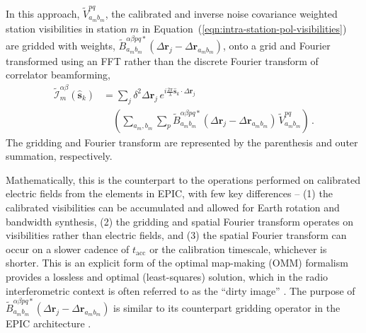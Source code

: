 \documentclass[
  journal=pasa,
  manuscript=article-type,
  year=2020,
  volume=37,
]{cup-journal}
\begin{document}
In this approach, $\widetilde{V}_{a_m b_m}^{pq}$, the calibrated and inverse noise covariance weighted station visibilities in station $m$ in Equation~(\ref{eqn:intra-station-pol-visibilities}) are gridded with weights, $\widetilde{B}_{a_m b_m}^{\alpha\beta pq*}(\Delta\boldsymbol{r}_j-\Delta\boldsymbol{r}_{a_m b_m})$, onto a grid and Fourier transformed using an FFT rather than the discrete Fourier transform of correlator beamforming,
\begin{align}
  \widetilde{\mathcal{I}}_m^{\alpha\beta}(\hat{\boldsymbol{s}}_k) &= \sum_j \delta^2 \Delta\boldsymbol{r}_j \, e^{i\frac{2\pi}{\lambda} \hat{\boldsymbol{s}}_k\cdot\Delta\boldsymbol{r}_j} \nonumber\\
  &\quad \left(\sum_{a_m,b_m} \sum_p \widetilde{B}_{a_m b_m}^{\alpha\beta pq*}(\Delta\boldsymbol{r}_j-\Delta\boldsymbol{r}_{a_m b_m}) \, \widetilde{V}_{a_m b_m}^{pq} \right) \, . \label{eqn:intra-station-pol-img-xfft-expl}
\end{align}
The gridding and Fourier transform are represented by the parenthesis and outer summation, respectively. 

Mathematically, this is the counterpart to the operations performed on calibrated electric fields from the elements in EPIC, with few key differences -- (1) the calibrated visibilities can be accumulated and allowed for Earth rotation and bandwidth synthesis, (2) the gridding and spatial Fourier transform operates on visibilities rather than electric fields, and (3) the spatial Fourier transform can occur on a slower cadence of $t_\textrm{acc}$ or the calibration timescale, whichever is shorter. This is an explicit form of the optimal map-making (OMM) formalism \citep{Tegmark1997a} provides a lossless and optimal (least-squares) solution, which in the radio interferometric context is often referred to as the ``dirty image'' \citep{TMS2017,SIRA-II}. The purpose of $\widetilde{B}_{a_m b_m}^{\alpha\beta pq*}(\Delta\boldsymbol{r}_j-\Delta\boldsymbol{r}_{a_m b_m})$ is similar \citep{Morales+2009,Bhatnagar+2008} to its counterpart gridding operator in the EPIC architecture \citep{Morales2011}. 
\end{document}
